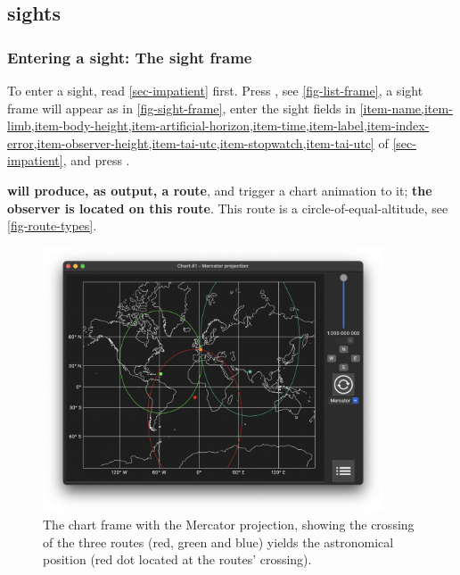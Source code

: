 \documentclass{ol-softwaremanual}
\begin{document}
\subsection{\Glspl{sight}}

\subsubsection{Entering a \gls{sight}: The \gls{sight} frame}

To enter a  \gls{sight}, read  \cref{sec-impatient}  first.  Press  , see \cref{fig-list-frame}, a \gls{sight} frame will appear as in \cref{fig-sight-frame}, enter the \gls{sight} fields in  \cref{item-name,item-limb,item-body-height,item-artificial-horizon,item-time,item-label,item-index-error,item-observer-height,item-tai-utc,item-stopwatch,item-tai-utc} of \cref{sec-impatient}, and press .

\textbf{\thel will produce, as output, a \gls{route}}, and trigger a chart animation to it; \textbf{the observer is located  on this route}. This \gls{route} is a \gls{circle-of-equal-altitude}, see \cref{fig-route-types}. 


\begin{figure}
  \centering
  \includegraphics[width=0.9\textwidth]{figures/astronomical-position-mercator.png}
  \caption{
    \label{fig-astronomical-position}
    The chart frame with the Mercator projection, showing the crossing of the three \glspl{route} (red, green and blue) yields the astronomical \gls{position} (red dot located at the \glspl{route}' crossing).  
  }
\end{figure}
\end{document}
